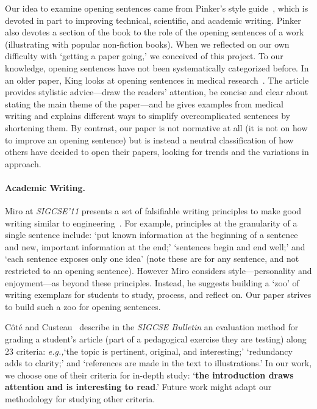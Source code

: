 \documentclass[sigconf]{acmart}
\newcommand{\eg}{\textit{e.g.,}\xspace}
\begin{document}
Our idea to examine opening sentences came from Pinker's style guide~\cite{Pin15}, which is devoted in part to improving technical, scientific, and academic writing. Pinker also devotes a section of the book to the role of the opening sentences of a work (illustrating with popular non-fiction books). When we reflected on our own difficulty with `getting a paper going,' we conceived of this project. To our knowledge, opening sentences have not been systematically categorized before. In an older paper, King looks at opening sentences in medical research~\cite{king1967opening}. The article provides stylistic advice---draw the readers' attention, be concise and clear about stating the main theme of the paper---and he gives examples from medical writing and explains different ways to simplify overcomplicated sentences by shortening them. By contrast, our paper is not normative at all (it is not on how to improve an opening sentence) but is instead a neutral classification of how others have decided to open their papers, looking for trends and the variations in approach.

\paragraph{Academic Writing.}  Miro at \textit{SIGCSE'11}  presents a set of falsifiable writing principles to make good writing similar to engineering~\cite{Mir11}. For example, principles at the granularity of a single sentence include: `put known information at the beginning of a sentence and new, important information at the end;' `sentences begin and end well;' and `each sentence exposes only one idea' (note these are for any sentence, and not restricted to an opening sentence). However Miro considers style---personality and enjoyment---as beyond these principles. Instead, he suggests building a `zoo' of writing exemplars for students to study, process, and reflect on. Our paper strives to build such a zoo for opening sentences.

Côté and Custeau~\cite{CC92} describe in the \textit{SIGCSE Bulletin} an evaluation method for grading a student's article (part of a pedagogical exercise they are testing) along 23 criteria: \eg `the topic is pertinent, original, and interesting;' `redundancy adds to clarity;' and `references are made in the text to illustrations.' In our work, we choose one of their criteria for in-depth study: `\textbf{the introduction draws attention and is interesting to read}.' Future work might adapt our methodology for studying other criteria.
\end{document}
